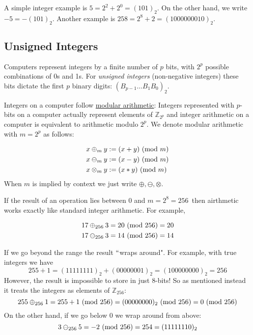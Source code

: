 \begin{example} A simple integer example is $5 = 2^2 + 2^0 = (101)_2$. On the other hand, we write $-5 = -(101)_2$. Another example is $258 = 2^8 + 2 = (1000000010)_2$. \end{example}

\subsection{Unsigned Integers}
Computers represent integers by a finite number of $p$ bits, with $2^p$ possible combinations of 0s and 1s. For \emph{unsigned integers} (non-negative integers) these bits dictate the first $p$ binary digits: $(B_{p-1}\ldots B_1B_0)_2$.

Integers on a computer follow \href{https://en.wikipedia.org/wiki/Modular_arithmetic}{modular arithmetic}: Integers represented with $p$-bits on a computer actually represent elements of ${\mathbb Z}_{2^p}$ and integer arithmetic on a computer is equivalent to arithmetic modulo $2^p$. We denote modular arithmetic with $m = 2^p$ as follows:


\begin{align*}
x \ensuremath{\oplus}_m y &:= (x+y)\ ({\rm mod}\ m) \\
x \ensuremath{\ominus}_m y &:= (x-y)\ ({\rm mod}\ m) \\
x \ensuremath{\otimes}_m y &:= (x*y)\ ({\rm mod}\ m)
\end{align*}
When $m$ is implied by context we just write $\ensuremath{\oplus}, \ensuremath{\ominus}, \ensuremath{\otimes}$.

\begin{example} If  the result of an operation lies between $0$ and $m = 2^8 = 256$ then airthmetic works exactly like standard integer arithmetic. For example,


\begin{align*}
17 \ensuremath{\oplus}_{256} 3 = 20\ ({\rm mod}\ 256) = 20 \\
17 \ensuremath{\ominus}_{256} 3 = 14\ ({\rm mod}\ 256) = 14
\end{align*}
\end{example}

\begin{example} If we go beyond the range the result \ensuremath{\ldq}wraps around". For example, with true integers we have
\[
255 + 1 = (11111111)_2 + (00000001)_2 = (100000000)_2 = 256
\]
However, the result is impossible to store in just 8-bits! So as mentioned instead it treats the integers as elements of ${\mathbb Z}_{256}$:
\[
255 \ensuremath{\oplus}_{256} 1 = 255 + 1 \ ({\rm mod}\ 256) = (00000000)_2 \ ({\rm mod}\ 256) = 0 \ ({\rm mod}\ 256)
\]
On the other hand, if we go below $0$ we wrap around from above:
\[
3 \ensuremath{\ominus}_{256} 5 = -2\ ({\rm mod}\ 256) = 254 = (11111110)_2
\]
\end{example}

